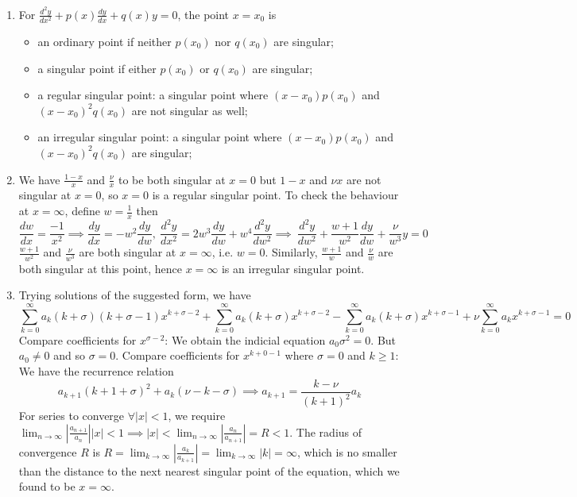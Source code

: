 \documentclass[a4paper]{article}
\begin{document}
\begin{ans}\leavevmode
\begin{enumerate}[label=(\alph*)]
\item For $\frac{d^2y}{dx^2}+p(x)\frac{dy}{dx}+q(x)y=0$, the point $x=x_0$ is
\begin{itemize}
    \item an ordinary point if neither $p(x_0)$ nor $q(x_0)$ are singular;
    \item a singular point if either $p(x_0)$ or $q(x_0)$ are singular;
    \item a regular singular point: a singular point where  $(x-x_0)p(x_0)$ and $(x-x_0)^2q(x_0)$ are not singular as well;
    \item an irregular singular point: a singular point where $(x-x_0)p(x_0)$ and $(x-x_0)^2q(x_0)$ are singular;
\end{itemize}
\item We have $\frac{1-x}{x}$ and $\frac{\nu}{x}$ to be both singular at $x=0$ but $1-x$ and $\nu x$ are not singular at $x=0$, so $x=0$ is a regular singular point. To check the behaviour at $x=\infty$, define $w=\frac{1}{x}$ then
$$\frac{dw}{dx}=\frac{-1}{x^2}\implies\frac{dy}{dx}=-w^2\frac{dy}{dw},~\frac{d^2y}{dx^2}=2w^3\frac{dy}{dw}+w^4\frac{d^2y}{dw^2}\implies~\frac{d^2y}{dw^2}+\frac{w+1}{w^2}\frac{dy}{dw}+\frac{\nu}{w^3}y=0$$
$\frac{w+1}{w^2}$ and $\frac{\nu}{w^3}$ are both singular at $x=\infty$, i.e. $w=0$. Similarly, $\frac{w+1}{w}$ and $\frac{\nu}{w}$ are both singular at this point, hence $x=\infty$ is an irregular singular point.
\item Trying solutions of the suggested form, we have
$$\sum_{k=0}^\infty a_k(k+\sigma)(k+\sigma-1)x^{k+\sigma-2}+\sum_{k=0}^\infty a_k(k+\sigma)x^{k+\sigma-2}-\sum_{k=0}^\infty a_k(k+\sigma)x^{k+\sigma-1}+\nu\sum_{k=0}^\infty a_kx^{k+\sigma-1}=0$$
Compare coefficients for $x^{\sigma-2}$: We obtain the indicial equation $a_0\sigma^2=0$. But $a_0\neq0$ and so $\sigma=0$. Compare coefficients for  $x^{k+0-1}$ where $\sigma=0$ and $k\geq1$: We have the recurrence relation
    $$a_{k+1}(k+1+\sigma)^2+a_k(\nu-k-\sigma)\implies a_{k+1}=\frac{k-\nu}{(k+1)^2}a_k$$
For series to converge $\forall|x|<1$, we require $\lim_{n\rightarrow\infty}|\frac{a_{n+1}}{a_n}||x|<1\implies|x|<\lim_{n\rightarrow\infty}|\frac{a_n}{a_{n+1}}|=R<1$. The radius of convergence $R$ is $R=\lim_{k\rightarrow\infty}|\frac{a_k}{a_{k+1}}|=\lim_{k\rightarrow\infty}|k|=\infty$, which is no smaller than the distance to the next nearest singular point of the equation, which we found to be $x=\infty$.

\end{enumerate}
\end{ans}
\end{document}
